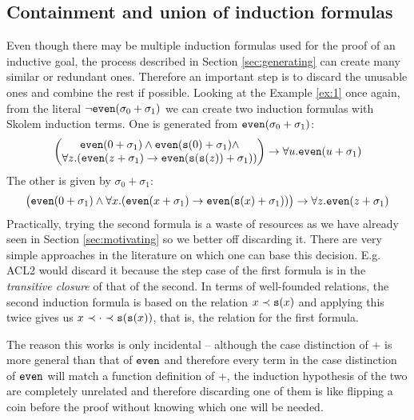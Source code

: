 \subsection{Containment and union of induction formulas}
Even though there may be multiple induction formulas used for the proof of an inductive goal, the process described in Section \ref{sec:generating} can create many similar or redundant ones. Therefore an important step is to discard the unusable ones and combine the rest if possible. Looking at the Example \ref{ex:1} once again, from the literal $\neg\mathtt{even}(\sigma_0+\sigma_1)$ we can create two induction formulas with Skolem induction terms. One is generated from $\mathtt{even}(\sigma_0+\sigma_1)$:
\begin{equation}\label{eq:even1}\begin{pmatrix}\mathtt{even}(0+\sigma_1)\land\mathtt{even}(\mathtt{s}(0)+\sigma_1)\land\\
\forall z.(\mathtt{even}(z+\sigma_1)\rightarrow\mathtt{even}(\mathtt{s}(\mathtt{s}(z))+\sigma_1))\end{pmatrix}\rightarrow \forall u.\mathtt{even}(u+\sigma_1)\end{equation}
The other is given by $\sigma_0+\sigma_1$:
\begin{equation}\label{eq:even2}\begin{pmatrix}\mathtt{even}(0+\sigma_1)\land\forall x.(\mathtt{even}(x+\sigma_1)\rightarrow\mathtt{even}(\mathtt{s}(x)+\sigma_1))\end{pmatrix}\rightarrow \forall z.\mathtt{even}(z+\sigma_1)\end{equation}
Practically, trying the second formula is a waste of resources as we have already seen in Section \ref{sec:motivating} so we better off discarding it. There are very simple approaches in the literature on which one can base this decision. E.g. ACL2 would discard it because the step case of the first formula is in the \textit{transitive closure} of that of the second. In terms of well-founded relations, the second induction formula is based on the relation $x\prec\mathtt{s}(x)$ and applying this twice gives us $x\prec\cdot\prec\mathtt{s}(\mathtt{s}(x))$, that is, the relation for the first formula.

The reason this works is only incidental -- although the case distinction of $+$ is more general than that of $\mathtt{even}$ and therefore every term in the case distinction of $\mathtt{even}$ will match a function definition of +, the induction hypothesis of the two are completely unrelated and therefore discarding one of them is like flipping a coin before the proof without knowing which one will be needed.

